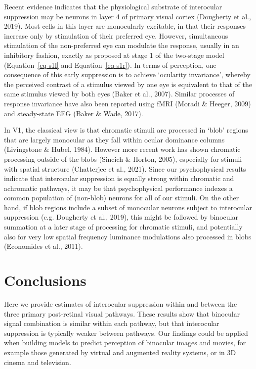 \documentclass[
  letterpaper,
  DIV=11,
  numbers=noendperiod]{scrartcl}
\begin{document}
Recent evidence indicates that the physiological substrate of
interocular suppression may be neurons in layer 4 of primary visual
cortex (Dougherty et al., 2019). Most cells in this layer are
monocularly excitable, in that their responses increase only by
stimulation of their preferred eye. However, simultaneous stimulation of
the non-preferred eye can modulate the response, usually in an
inhibitory fashion, exactly as proposed at stage 1 of the two-stage
model (Equation~\ref{eq-s1l} and Equation~\ref{eq-s1r}). In terms of
perception, one consequence of this early suppression is to achieve
`ocularity invariance', whereby the perceived contrast of a stimulus
viewed by one eye is equivalent to that of the same stimulus viewed by
both eyes (Baker et al., 2007). Similar processes of response invariance
have also been reported using fMRI (Moradi \& Heeger, 2009) and
steady-state EEG (Baker \& Wade, 2017).

In V1, the classical view is that chromatic stimuli are processed in
`blob' regions that are largely monocular as they fall within ocular
dominance columns (Livingstone \& Hubel, 1984). However more recent work
has shown chromatic processing outside of the blobs (Sincich \& Horton,
2005), especially for stimuli with spatial structure (Chatterjee et al.,
2021). Since our psychophysical results indicate that interocular
suppression is equally strong within chromatic and achromatic pathways,
it may be that psychophysical performance indexes a common population of
(non-blob) neurons for all of our stimuli. On the other hand, if blob
regions include a subset of monocular neurons subject to interocular
suppression (e.g. Dougherty et al., 2019), this might be followed by
binocular summation at a later stage of processing for chromatic
stimuli, and potentially also for very low spatial frequency luminance
modulations also processed in blobs (Economides et al., 2011).

\section{Conclusions}\label{conclusions}

Here we provide estimates of interocular suppression within and between
the three primary post-retinal visual pathways. These results show that
binocular signal combination is similar within each pathway, but that
interocular suppression is typically weaker between pathways. Our
findings could be applied when building models to predict perception of
binocular images and movies, for example those generated by virtual and
augmented reality systems, or in 3D cinema and television.
\end{document}
